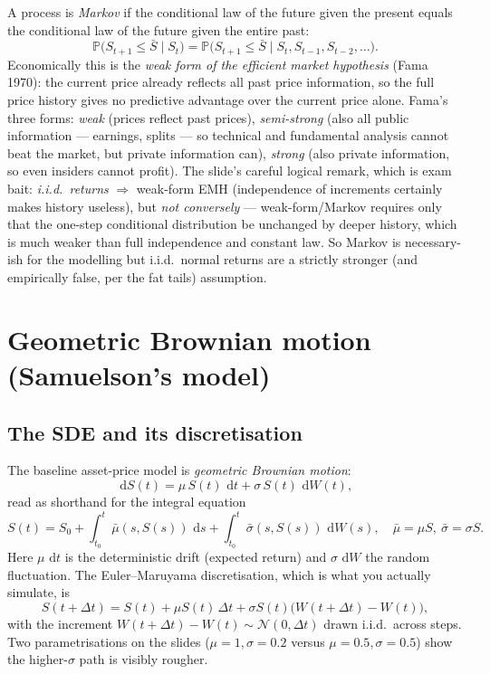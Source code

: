 \documentclass[11pt]{article}
\newcommand{\dd}{\,\mathrm{d}}
\begin{document}
A process is \emph{Markov} if the conditional law of the future given the present equals the conditional law of the future given the entire past:
\[
\mathbb{P}\big(S_{t+1}\le \bar S\mid S_t\big)=\mathbb{P}\big(S_{t+1}\le \bar S\mid S_t,S_{t-1},S_{t-2},\dots\big).
\]
Economically this is the \emph{weak form of the efficient market hypothesis} (Fama 1970): the current price already reflects all past price information, so the full price history gives no predictive advantage over the current price alone. Fama's three forms: \emph{weak} (prices reflect past prices), \emph{semi-strong} (also all public information --- earnings, splits --- so technical and fundamental analysis cannot beat the market, but private information can), \emph{strong} (also private information, so even insiders cannot profit). The slide's careful logical remark, which is exam bait: \emph{i.i.d.\ returns} $\Rightarrow$ weak-form EMH (independence of increments certainly makes history useless), but \emph{not conversely} --- weak-form/Markov requires only that the one-step conditional distribution be unchanged by deeper history, which is much weaker than full independence and constant law. So Markov is necessary-ish for the modelling but i.i.d.\ normal returns are a strictly stronger (and empirically false, per the fat tails) assumption.

\section{Geometric Brownian motion (Samuelson's model)}

\subsection{The SDE and its discretisation}

The baseline asset-price model is \emph{geometric Brownian motion}:
\[
\dd S(t)=\mu\,S(t)\,\dd t+\sigma\,S(t)\,\dd W(t),
\]
read as shorthand for the integral equation
\[
S(t)=S_0+\int_{t_0}^{t}\bar\mu(s,S(s))\,\dd s+\int_{t_0}^{t}\bar\sigma(s,S(s))\,\dd W(s),
\quad \bar\mu=\mu S,\ \bar\sigma=\sigma S.
\]
Here $\mu\,\dd t$ is the deterministic drift (expected return) and $\sigma\,\dd W$ the random fluctuation. The Euler--Maruyama discretisation, which is what you actually simulate, is
\[
S(t+\Delta t)=S(t)+\mu S(t)\,\Delta t+\sigma S(t)\big(W(t+\Delta t)-W(t)\big),
\]
with the increment $W(t+\Delta t)-W(t)\sim\mathcal{N}(0,\Delta t)$ drawn i.i.d.\ across steps. Two parametrisations on the slides ($\mu=1,\sigma=0.2$ versus $\mu=0.5,\sigma=0.5$) show the higher-$\sigma$ path is visibly rougher.
\end{document}
